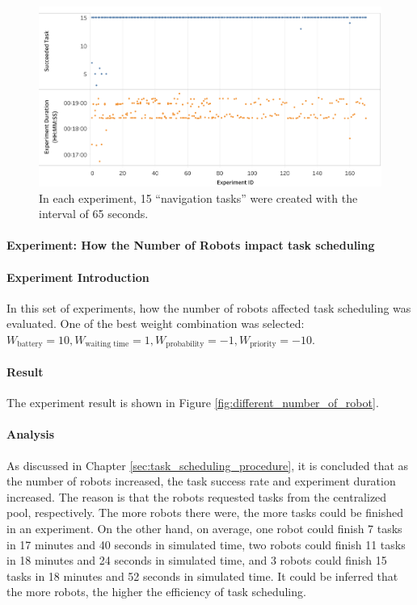 \begin{figure}
 \centering
 \includegraphics[width = 1.0\textwidth]{content/images/ch5/execute_experiment_65s.png}
 \caption{In each experiment, 15 ``navigation tasks'' were created with the interval of 65 seconds.}
 \label{fig:experiment_task_65s}
\end{figure}

\paragraph{Experiment: How the Number of Robots impact task scheduling}

\paragraph{Experiment Introduction} 
In this set of experiments, how the number of robots affected task scheduling was evaluated. One of the best weight combination was selected: $ W_{\mbox{battery}} = 10,W_{\mbox{waiting time}} = 1, W_{\mbox{probability}} = -1, W_{\mbox{priority}} = -10 $. 
 
\paragraph{Result} The experiment result is shown in Figure \ref{fig:different_number_of_robot}.

\paragraph{Analysis} As discussed in Chapter \ref{sec:task_scheduling_procedure}, it is concluded that as the number of robots increased, the task success rate and experiment duration increased. The reason is that the robots requested tasks from the centralized pool, respectively. The more robots there were, the more tasks could be finished in an experiment. 
On the other hand, on average, one robot could finish 7 tasks in 17 minutes and 40 seconds in simulated time, two robots could finish 11 tasks in 18 minutes and 24 seconds in simulated time, and 3 robots could finish 15 tasks in 18 minutes and 52 seconds in simulated time. It could be inferred that the more robots, the higher the efficiency of task scheduling.

